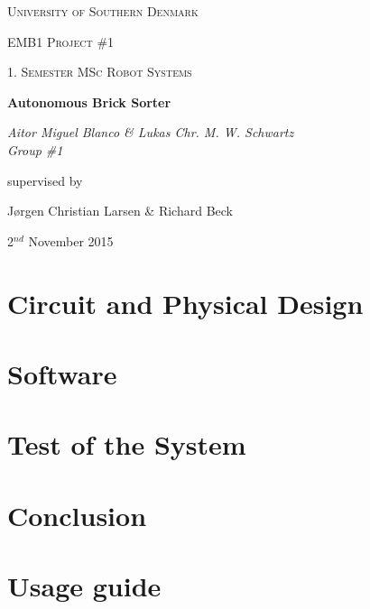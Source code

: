 \documentclass[12pt,a4paper]{article}
\begin{document}
\begin{titlepage}
	\centering
	\vfill
	{\scshape\LARGE University of Southern Denmark\par}
	\vspace{1cm}
	{\scshape\Large EMB1 Project \#1\par}
	{\scshape\large 1. Semester MSc Robot Systems\par}
	\vspace{1.5cm}
	{\huge\bfseries Autonomous Brick Sorter\par}
	\vspace{2cm}
	{\Large\itshape Aitor Miguel Blanco \& Lukas Chr. M. W. Schwartz \\ Group \#1 \par}
	\vfill
	supervised by\par
	J\o rgen Christian Larsen \& Richard Beck

	\vspace{2cm}

	{\large 2$^{nd}$ November 2015 \par}
\end{titlepage}

\pagebreak

\tableofcontents

\pagebreak

\listoffigures

\listoftables

\pagebreak


\pagebreak

\section{Circuit and Physical Design}






\pagebreak
\section{Software}








\pagebreak
\section{Test of the System}


\pagebreak
\section{Conclusion}


\pagebreak
\appendix
\section{Usage guide}

\end{document}
